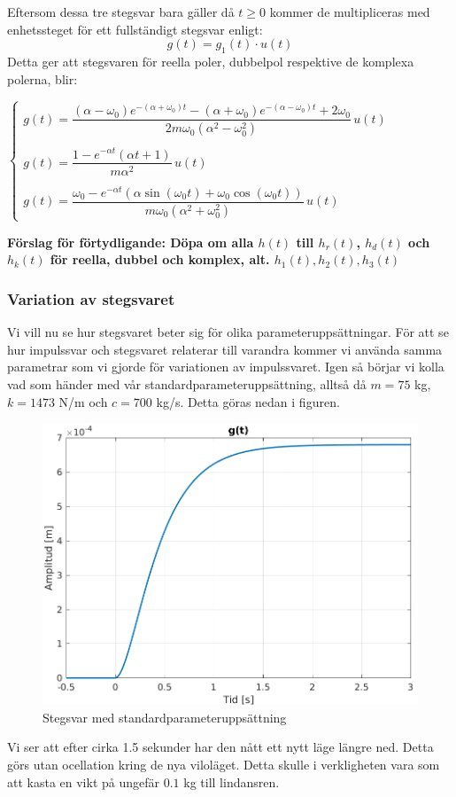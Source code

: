 Eftersom dessa tre stegsvar bara gäller då $t\ge 0$ kommer de multipliceras med enhetssteget för ett fullständigt stegsvar enligt:
$$g(t)=g_1(t)\cdot u(t)$$
Detta ger att stegsvaren för reella poler, dubbelpol respektive de komplexa polerna, blir:

$\begin{cases}
g(t)=\dfrac{(\alpha-\omega_0)e^{-(\alpha+\omega_0)t}-(\alpha+\omega_0)e^{-(\alpha-\omega_0)t}+2\omega_0}{2m\omega_0(\alpha^2-\omega_0^2)}\,u(t) \\\\
g(t)=\dfrac{1-e^{-\alpha t}(\alpha t+1)}{m\alpha^2}\,u(t) \\\\
g(t)=\dfrac{\omega_0-e^{-\alpha t}(\alpha\sin(\omega_0 t)+\omega_0\cos(\omega_0 t))}{m\omega_0(\alpha^2+\omega_0^2)}\,u(t)
\end{cases}$

\textbf{Förslag för förtydligande: Döpa om alla $h(t)$ till $h_r(t)$, $h_d(t)$  och $h_k(t)$ för reella, dubbel och komplex, alt. $h_1(t), h_2(t), h_3(t)$}

\newpage
\subsubsection{Variation av stegsvaret}
Vi vill nu se hur stegsvaret beter sig för olika parameteruppsättningar. För att se hur impulssvar och stegsvaret relaterar till varandra kommer vi använda samma parametrar som vi gjorde för variationen av impulssvaret. Igen så börjar vi kolla vad som händer med vår standardparameteruppsättning, alltså då $m = 75$ kg, $k=1473$ N/m och $c=700$ kg/s. Detta göras nedan i figuren.
\begin{figure}[H]
    \centering
    \includegraphics[scale=0.9]{bilder/stegsvar}
    \caption{Stegsvar med standardparameteruppsättning}
    \label{fig:stegsvar}
\end{figure}
Vi ser att efter cirka 1.5 sekunder har den nått ett nytt läge längre ned. Detta görs utan ocellation kring de nya viloläget. Detta skulle i verkligheten vara som  att kasta en vikt på ungefär $0.1$ kg till lindansren.


